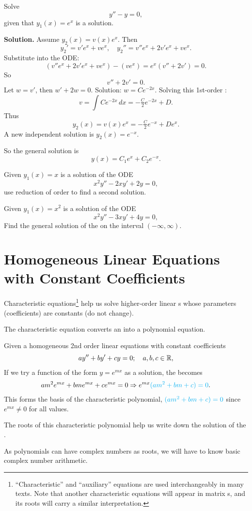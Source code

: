 \begin{example}
Solve
\[
y'' - y = 0,
\]
given that $y_1(x)=e^x$ is a solution.

\textbf{Solution.}  
Assume $y_2(x) = v(x)e^x$. Then
\[
y_2' = v'e^x + ve^x, \quad y_2''= v''e^x+2v'e^x+ve^x.
\]
Substitute into the ODE:
\[
(v''e^x+2v'e^x+ve^x) - (ve^x) = e^x(v''+2v')=0.
\]
So
\[
v''+2v'=0.
\]
Let $w=v'$, then $w'+2w=0$. Solution: $w=Ce^{-2x}$.  
Solving this 1st-order \ode{}:
\[
v=\int Ce^{-2x}\,dx = -\tfrac{C}{2}e^{-2x}+D.
\]
Thus
\[
y_2(x) = v(x)e^x = -\tfrac{C}{2}e^{-x}+De^x.
\]
A new independent solution is $y_2(x)=e^{-x}$.

So the general solution is
\[
y(x)=C_1 e^x + C_2 e^{-x}.
\]
\end{example}


\begin{question}
Given $y_1(x)=x$ is a solution of the ODE
\[
x^2y'' - 2xy' + 2y = 0,
\]
use reduction of order to find a second solution.
\end{question}


\begin{question}
Given $y_1(x)=x^2$ is a solution of the ODE
\[
x^2y'' - 3xy' + 4y = 0,
\]
Find the general solution of the \ode{} on the interval \((-\infty, \infty)\).
\end{question}




\section{Homogeneous Linear Equations with Constant Coefficients}
  \begin{description}
    \item Characteristic equations\footnote{``Characteristic'' and ``auxiliary'' equations are used interchangeably in many texts.
      Note that another characteristic equations will appear in matrix \ode{}s, and its roots will carry a similar interpretation.} 
      help us solve higher-order linear \ode{}s whose parameters (coefficients) are constants (do not change).
    \item The characteristic equation converts an \ode{} into a polynomial equation.

          Given a \textcolor{blue!70}{homogeneous 2nd order linear equations with constant coefficients}
          \[ ay'' + by' + cy = 0; \quad a,b,c \in \mathbb{R},
          \]
          If we try a function of the form \(y = e^{mx}\) as a solution, the \ode{} becomes
          \[am^2e^{mx} + bme^{mx} + ce^{mx} = 0 \Rightarrow e^{mx}\textcolor{cyan}{(am^2 + bm + c) = 0}. 
          \]
          This forms the basis of the characteristic polynomial, \(\textcolor{cyan}{(am^2 + bm + c) = 0}\) since \(e^{mx} \neq 0\) for all values.
    \item The roots of this characteristic polynomial help us write down the solution of the \ode{}.
    \item As polynomials can have complex numbers as roots, we will have to know basic complex number arithmetic.
  \end{description}


